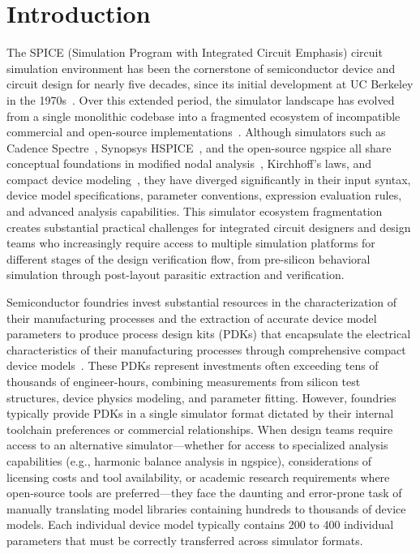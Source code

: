 \documentclass[10pt,twocolumn]{article}
\begin{document}
\section{Introduction}
\label{sec:introduction}

The SPICE (Simulation Program with Integrated Circuit Emphasis) circuit simulation environment has been the cornerstone of semiconductor device and circuit design for nearly five decades, since its initial development at UC Berkeley in the 1970s~\cite{spice70, spice_reference}. Over this extended period, the simulator landscape has evolved from a single monolithic codebase into a fragmented ecosystem of incompatible commercial and open-source implementations~\cite{ngspice, circuit_simulation}. Although simulators such as Cadence Spectre~\cite{spectre}, Synopsys HSPICE~\cite{hspice, hspice2}, and the open-source ngspice all share conceptual foundations in modified nodal analysis~\cite{mna_analysis}, Kirchhoff's laws, and compact device modeling~\cite{bsim4, bsim_history}, they have diverged significantly in their input syntax, device model specifications, parameter conventions, expression evaluation rules, and advanced analysis capabilities. This simulator ecosystem fragmentation creates substantial practical challenges for integrated circuit designers and design teams who increasingly require access to multiple simulation platforms for different stages of the design verification flow, from pre-silicon behavioral simulation through post-layout parasitic extraction and verification.

Semiconductor foundries invest substantial resources in the characterization of their manufacturing processes and the extraction of accurate device model parameters to produce process design kits (PDKs) that encapsulate the electrical characteristics of their manufacturing processes through comprehensive compact device models~\cite{pdk_methodology, characterization_methods}. These PDKs represent investments often exceeding tens of thousands of engineer-hours, combining measurements from silicon test structures, device physics modeling, and parameter fitting. However, foundries typically provide PDKs in a single simulator format dictated by their internal toolchain preferences or commercial relationships. When design teams require access to an alternative simulator---whether for access to specialized analysis capabilities (e.g., harmonic balance analysis in ngspice), considerations of licensing costs and tool availability, or academic research requirements where open-source tools are preferred---they face the daunting and error-prone task of manually translating model libraries containing hundreds to thousands of device models. Each individual device model typically contains 200 to 400 individual parameters that must be correctly transferred across simulator formats.
\end{document}
